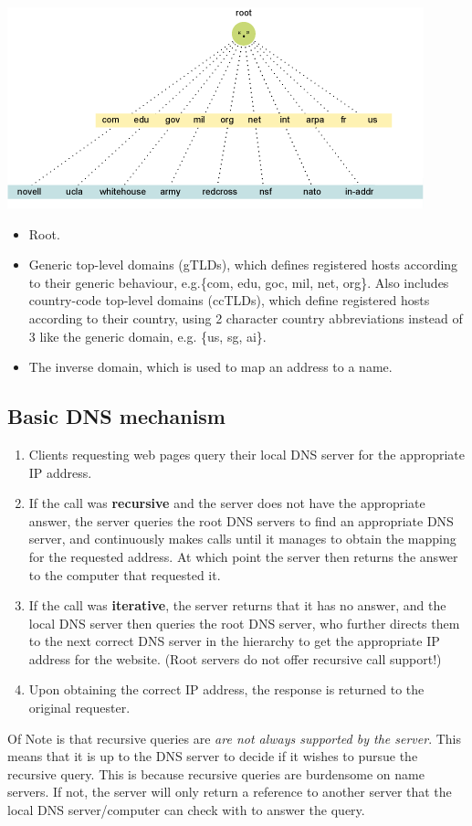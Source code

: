 \documentclass{article}
\begin{document}
\begin{center}
\includegraphics[width=\textwidth]{dns.png}
\end{center}

\begin{itemize}
\item Root.
\item Generic top-level domains (gTLDs), which defines registered hosts according to their generic behaviour, e.g.\{com, edu, goc, mil, net, org\}. Also includes country-code top-level domains (ccTLDs), which define registered hosts according to their country, using 2 character country abbreviations instead of 3 like the generic domain, e.g. \{us, sg, ai\}.
\item The inverse domain, which is used to map an address to a name.
\end{itemize}
\subsection{Basic DNS mechanism}
\begin{enumerate}
    \item Clients requesting web pages query their local DNS server for the appropriate IP address.
    \item If the call was \textbf{recursive} and the server does not have the appropriate answer, the server queries the root DNS servers to find an appropriate DNS server, and continuously makes calls until it manages to obtain the mapping for the requested address. At which point the server then returns the answer to the computer that requested it.
    \item If the call was \textbf{iterative}, the server returns that it has no answer, and the local DNS server then queries the root DNS server, who further directs them to the next correct DNS server in the hierarchy to get the appropriate IP address for the website. (Root servers do not offer recursive call support!)
    \item Upon obtaining the correct IP address, the response is returned to the original requester.
\end{enumerate}
Of Note is that recursive queries are \textit{are not always supported by the server}. This means that it is up to the DNS server to decide if it wishes to pursue the recursive query. This is because recursive queries are burdensome on name servers. If not, the server will only return a reference to another server that the local DNS server/computer can check with to answer the query.
\end{document}
